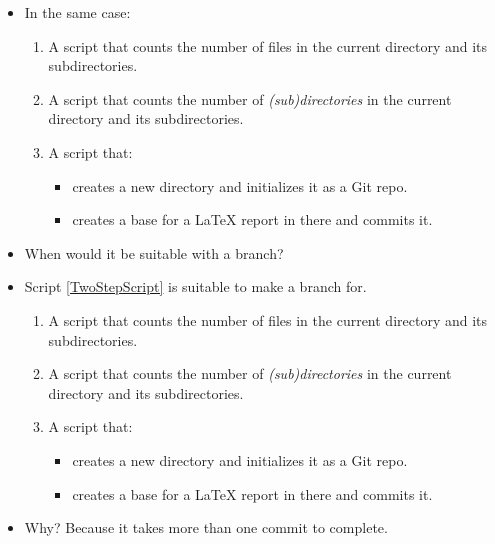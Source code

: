 \begin{frame}
  \begin{exercise}
    \begin{itemize}
      \item In the same case:
        \begin{enumerate}
          \item A script that counts the number of files in the current 
            directory and its subdirectories.
          \item A script that counts the number of \emph{(sub)directories} in 
            the current directory and its subdirectories.
          \item A script that:
            \begin{itemize}
              \item creates a new directory and initializes it as a Git repo.
              \item creates a base for a LaTeX report in there and commits it.
            \end{itemize}
        \end{enumerate}
      \item When would it be suitable with a branch?
    \end{itemize}
  \end{exercise}
\end{frame}

\begin{frame}
  \begin{solution}
    \begin{itemize}
      \item Script \ref{TwoStepScript} is suitable to make a branch for.
        \begin{enumerate}
          \item A script that counts the number of files in the current 
            directory and its subdirectories.
          \item A script that counts the number of \emph{(sub)directories} in 
            the current directory and its subdirectories.
          \item \label{TwoStepScript} A script that:
            \begin{itemize}
              \item creates a new directory and initializes it as a Git 
                repo.
              \item creates a base for a LaTeX report in there and commits 
                it.
            \end{itemize}
        \end{enumerate}
      \item Why?
        Because it takes more than one commit to complete.
    \end{itemize}
  \end{solution}
\end{frame}

